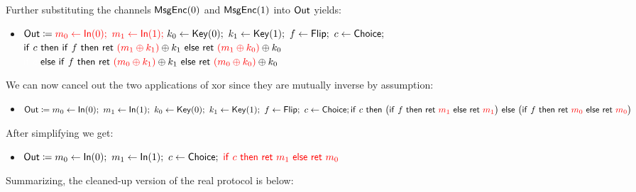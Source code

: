 \noindent Further substituting the channels $\mathsf{MsgEnc}(0)$ and $\mathsf{MsgEnc}(1)$ into $\mathsf{Out}$ yields:

\begin{itemize}
\item $\Out \coloneqq {\color{red} m_0 \leftarrow \In(0); \ m_1 \leftarrow \In(1);} \ k_0 \leftarrow \Key(0); \ k_1 \leftarrow \Key(1); \ f \leftarrow \Flip; \ c \leftarrow \Choice;$ \\ $\mathsf{if} \ c \ \mathsf{then} \ \ifte{f}{\ret{{\color{red} (m_1 \oplus k_1)} \oplus k_1}}{\ret{{\color{red} (m_1 \oplus k_0)} \oplus k_0}}$ \\ ${\color{white} \mathsf{if} \ c \ } \mathsf{else} \ \ifte{f}{\ret{{\color{red} (m_0 \oplus k_1)} \oplus k_1}}{\ret{{\color{red} (m_0 \oplus k_0)} \oplus k_0}}$
\end{itemize}

\noindent We can now cancel out the two applications of xor since they are mutually inverse by assumption:

\begin{itemize}
\item $\mathsf{Out} \coloneqq m_0 \leftarrow \mathsf{In}(0); \ m_1 \leftarrow \mathsf{In}(1); \ k_0 \leftarrow \mathsf{Key}(0); \ k_1 \leftarrow \mathsf{Key}(1); \ f \leftarrow \mathsf{Flip}; \ c \leftarrow \mathsf{Choice}; \\ \mathsf{if} \ c \ \mathsf{then} \ \big(\mathsf{if} \ f \ \mathsf{then} \ \mathsf{ret} \ {\color{red} m_1} \ \mathsf{else} \ \mathsf{ret} \ {\color{red} m_1}\big) \ \mathsf{else} \ \big(\mathsf{if} \ f \ \mathsf{then} \ \mathsf{ret} \ {\color{red} m_0} \ \mathsf{else} \ \mathsf{ret} \ {\color{red} m_0}\big)$
\end{itemize}

\noindent After simplifying we get:

\begin{itemize}
\item $\mathsf{Out} \coloneqq m_0 \leftarrow \mathsf{In}(0); \ m_1 \leftarrow \mathsf{In}(1); \ c \leftarrow \mathsf{Choice}; \ {\color{red} \mathsf{if} \ c \ \mathsf{then} \ \mathsf{ret} \ m_1 \ \mathsf{else} \ \mathsf{ret} \ m_0}$
\end{itemize}

\noindent Summarizing, the cleaned-up version of the real protocol is below:


